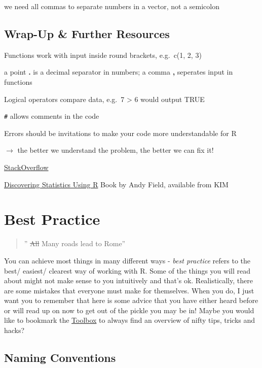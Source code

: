 \documentclass[
]{book}
\begin{document}
we need all commas to separate numbers in a vector, not a semicolon

\section*{Wrap-Up \& Further Resources}\label{wrap-up-further-resources-1}

Functions work with input inside round brackets, e.g.~c(1, 2, 3)

a point \textbf{.} is a decimal separator in numbers; a comma \textbf{,} seperates input in functions

Logical operators compare data, e.g.~7 \textgreater{} 6 would output TRUE

\texttt{\#} allows comments in the code

Errors should be invitations to make your code more understandable for R

\(\rightarrow\) the better we understand the problem, the better we can fix it!

\href{https://stackoverflow.com/}{StackOverflow}

\href{https://katalog.uni-konstanz.de/libero/WebOpac.cls?VERSION=2&ACTION=DISPLAY&RSN=2222774&DATA=KON&TOKEN=nGIfSiZsIA5826&Z=1&SET=1}{Discovering Statistics Using R} Book by Andy Field, available from KIM

\chapter{Best Practice}\label{best-practice}

\begin{quote}
'' \st{All} Many roads lead to Rome''
\end{quote}

You can achieve most things in many different ways - \emph{best practice} refers to the best/ easiest/ clearest way of working with R.
Some of the things you will read about might not make sense to you intuitively and that's ok.
Realistically, there are some mistakes that everyone must make for themselves.
When you do, I just want you to remember that here is some advice that you have either heard before or will read up on now to get out of the pickle you may be in!
Maybe you would like to bookmark the \hyperref[toolbox]{Toolbox} to always find an overview of nifty tips, tricks and hacks?

\section{Naming Conventions}\label{varnames}
\end{document}
